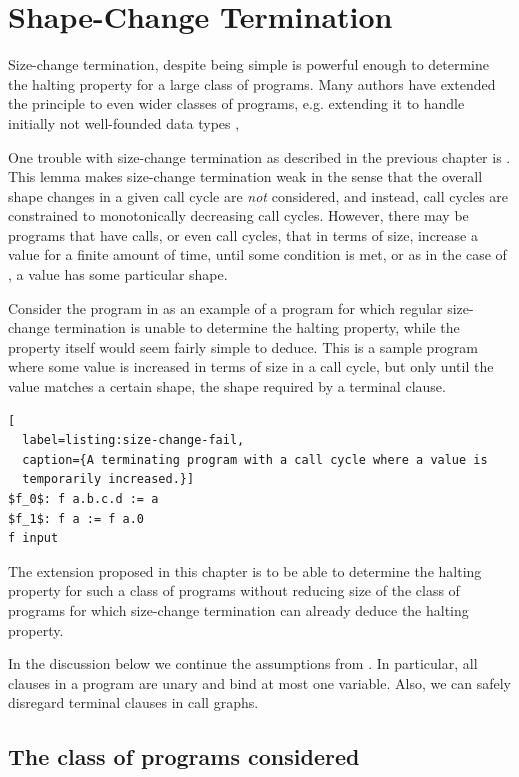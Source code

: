 \chapter{Shape-Change Termination}

Size-change termination, despite being simple is powerful enough to determine
the halting property for a large class of programs. Many authors have extended
the principle to even wider classes of programs, e.g. extending it to handle
initially not well-founded data types \cite{bound-analysis}, 

One trouble with size-change termination as described in the previous chapter
is . This lemma makes size-change termination weak
in the sense that the overall shape changes in a given call cycle are
\emph{not} considered, and instead, call cycles are constrained to
monotonically decreasing call cycles.  However, there may be programs that have
calls, or even call cycles, that in terms of size, increase a value for a
finite amount of time, until some condition is met, or as in the case of \D{},
a value has some particular shape.

Consider the program in  as an example of a
program for which regular size-change termination is unable to determine the
halting property, while the property itself would seem fairly simple to deduce.
This is a sample program where some value is increased in terms of size in a
call cycle, but only until the value matches a certain shape, the shape
required by a terminal clause.

\begin{lstlisting}[
  label=listing:size-change-fail,
  caption={A terminating program with a call cycle where a value is
  temporarily increased.}]
$f_0$: f a.b.c.d := a
$f_1$: f a := f a.0
f input
\end{lstlisting}

The extension proposed in this chapter is to be able to determine the halting
property for such a class of programs without reducing size of the class of
programs for which size-change termination can already deduce the halting
property.

In the discussion below we continue the assumptions from
. In particular, all clauses in a
program are unary and bind at most one variable. Also, we can safely disregard
terminal clauses in call graphs.

\section{The class of programs considered}

